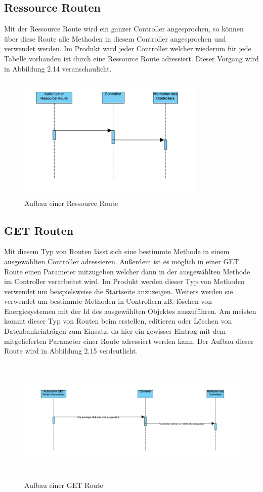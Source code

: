\subsection{Ressource Routen} 
Mit der Ressource Route wird ein ganzer Controller angesprochen, so können über diese Route alle Methoden in diesem Controller angesprochen und verwendet werden. Im Produkt wird jeder Controller welcher wiederum für jede Tabelle vorhanden ist durch eine Ressource Route adressiert. Dieser Vorgang wird in Abbildung 2.14 veranschaulicht.

\begin{figure}[h]
	\centering
	\includegraphics[height=6cm,width=9cm]{images/ResourceRoute}
	\caption{Aufbau einer Ressource Route}
	\label{fig:ResourceRoute}
\end{figure}

\subsection{GET Routen}
Mit diesem Typ von Routen lässt sich eine bestimmte Methode in einem ausgewählten Controller adressieren. Außerdem ist es möglich in einer GET Route einen Parameter mitzugeben welcher dann in der ausgewählten Methode im Controller verarbeitet wird. Im Produkt werden dieser Typ von Methoden verwendet um beispielsweise die Startseite anzuzeigen. Weiters werden sie verwendet um bestimmte Methoden in Controllern zB. löschen von Energiesystemen mit der Id des ausgewählten Objektes auszuführen. Am meisten kommt dieser Typ von Routen beim erstellen, editieren oder Löschen von Datenbankeinträgen zum Einsatz, da hier ein gewisser Eintrag mit dem mitgelieferten Parameter einer Route adressiert werden kann. Der Aufbau dieser Route wird in Abbildung 2.15 verdeutlicht.


\begin{figure}[h]
	\centering
	\includegraphics[height=6cm,width=16cm]{images/GETRoute}
	\caption{Aufbau einer GET Route}
	\label{fig:GETRoute}
\end{figure}

